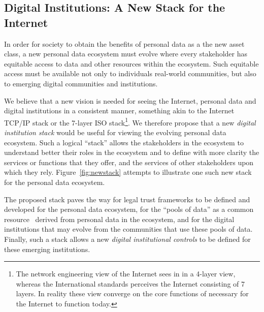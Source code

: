 \subsection{Digital Institutions: A New Stack for the Internet}

In order for society to obtain the benefits of 
personal data as a the new asset class,
a new personal data ecosystem must evolve where
every stakeholder has equitable access to data and other resources
within the ecosystem.
Such equitable access must be available not only to individuals
real-world communities,
but also to emerging digital communities and institutions.

We believe that a new vision is needed for seeing the 
Internet, personal data and digital institutions
in a consistent manner, something akin to the Internet
TCP/IP stack or the 7-layer ISO stack\footnote{
The network engineering view of the Internet sees
in in a 4-layer view, whereas the International standards
perceives the Internet consisting of 7 layers.
In reality these view converge on the core functions
of necessary for the Internet to function today.}.
We therefore propose that a new {\em digital institution stack} would
be useful for viewing the evolving personal data ecosystem.
Such a logical ``stack'' allows the stakeholders in the ecosystem
to understand better their roles in the ecosystem
and to define with more clarity the services or functions
that they offer, and the services
of other stakeholders upon which they rely.
Figure~\ref{fig:newstack} attempts to illustrate
one such new stack for the personal data ecosystem.

The proposed stack paves the way for legal trust frameworks
to be defined and developed for the personal data ecosystem,
for the ``pools of data'' as a common resource~\cite{Ostrom2009}
derived from personal data in the ecosystem,
and for the digital institutions that may evolve
from the communities that use these pools of data.
Finally, such a stack allows a  new {\em digital institutional controls}
to be defined for these emerging institutions.

